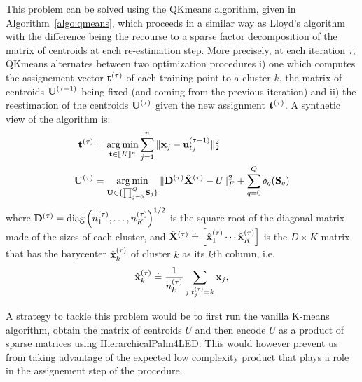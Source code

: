 This problem can be solved using the QKmeans algorithm, given in Algorithm~\ref{algo:qmeans},
which proceeds in a similar way as Lloyd's algorithm with the difference being the 
recourse to a sparse factor decomposition of the matrix of centroids at
each re-estimation step. More precisely, at each iteration $\tau$, 
QKmeans alternates between two 
optimization procedures i) one which computes the assignement vector ${\mathbf{t}}^{(\tau)}$ 
of each training point to a cluster $k$, the matrix of centroids ${\mathbf{U}}^{(\tau-1)}$ being
fixed (and coming from the previous iteration) and ii) the reestimation of the centroids
 ${\mathbf{U}}^{(\tau)}$ given the new assignment ${\mathbf{t}}^{(\tau)}$. A synthetic view of the algorithm
 is:
\begin{subequations}
\label{eq:qmeans}
\begin{align}
{\mathbf{t}}^{(\tau)} &= \operatorname*{arg\,min}_{{\mathbf{t}}\in\llbracket K\rrbracket^n}\sum_{j=1}^n\|{\mathbf{x}}_j-{\mathbf{u}}_{t_j}^{(\tau-1)}\|_{2}^2\label{eq:assignment}\\
{\mathbf{U}}^{(\tau)} &= \operatorname*{arg\,min}_{{\mathbf{U}}\in\{\prod_{j=0}^Q{\mathbf{S}}_j\}}\|{\mathbf{D}}^{(\tau)}\hat{{\mathbf{X}}}^{(\tau)}-U\|_F^2+\sum_{q=0}^{Q} \delta_q({\mathbf{S}}_q)\label{eq:reestimation}
\end{align}
\end{subequations}
where ${\mathbf{D}}^{(\tau)}=\text{diag}\left({n_1^{(\tau)}},\ldots,{n_K^{(\tau)}}\right)^{1/2}$ is the square
root of the diagonal matrix made of the sizes of each cluster, and $\hat{{\mathbf{X}}}^{(\tau)}\doteq \left[\hat{{\mathbf{x}}}^{(\tau)}_1\cdots\hat{{\mathbf{x}}}^{(\tau)}_K\right]$
is the $D\times K$ matrix that has the barycenter $\hat{{\mathbf{x}}}^{(\tau)}_k$ of cluster $k$ as
its $k$th column, i.e.
\begin{align}
	\hat{{\mathbf{x}}}^{(\tau)}_k \doteq \frac{1}{n_k^{(\tau)}}\sum_{j:t_j^{(\tau)}=k}{\mathbf{x}}_j,
\end{align}





\begin{remark}
A strategy to tackle this problem would be to first run the vanilla K-means algorithm,
 obtain the matrix of centroids $U$ and then encode $U$ as a product of sparse matrices
 using HierarchicalPalm4LED. This would however prevent us from taking advantage of 
 the expected low complexity product that plays a role in the assignement step of 
 the procedure.
\end{remark}

